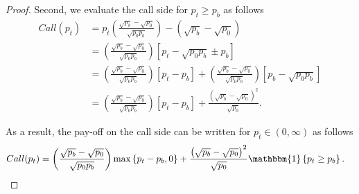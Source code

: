 \documentclass[pdftex,11pt,a4paper] {article}
\begin{document}
\begin{proof}
Second, we evaluate the call side for $p_{t}  \geq  p_{b}$ as follows
\begin{equation} \label{eq:mdp4}
\begin{split}
Call(p_{t}) & = p_{t} \left(\frac{\sqrt{p_{b}}-\sqrt{p_{0}}}{\sqrt{p_{0}p_{b}}} \right) -  \left(\sqrt{p_{b}} - \sqrt{p_{0}}\right)\\
& =  \left(\frac{\sqrt{p_{b}}-\sqrt{p_{0}}}{\sqrt{p_{0}p_{b}}} \right)  \left[ p_{t} - \sqrt{p_{0}p_{b}} \pm p_{b} \right]\\
& =  \left(\frac{\sqrt{p_{b}}-\sqrt{p_{0}}}{\sqrt{p_{0}p_{b}}} \right)  \left[ p_{t}-p_{b}\right] + \left(\frac{\sqrt{p_{b}}-\sqrt{p_{0}}}{\sqrt{p_{0}p_{b}}} \right) \left[p_{b} - \sqrt{p_{0}p_{b}} \right]\\
& =  \left(\frac{\sqrt{p_{b}}-\sqrt{p_{0}}}{\sqrt{p_{0}p_{b}}} \right)  \left[ p_{t}-p_{b}\right] + \frac{\left(\sqrt{p_{b}}-\sqrt{p_{0}}\right)^{2}}{\sqrt{p_{0}}}.
\end{split}
\end{equation}


As a result, the pay-off on the call side can be written for $p_{t}\in(0, \infty)$ as follows
\begin{equation} \label{eq:mdp5}
\begin{split}
Call(p_{t}) & = \left(\frac{\sqrt{p_{b}}-\sqrt{p_{0}}}{\sqrt{p_{0}p_{b}}} \right)  \max\left\{ p_{t}-p_{b}, 0 \right\} + \frac{\left(\sqrt{p_{b}}-\sqrt{p_{0}}\right)^{2}}{\sqrt{p_{0}}} \mathbbm{1}\left\{p_{t} \geq p_{b}\right\}.
\end{split}
\end{equation}




\end{proof}
\end{document}
